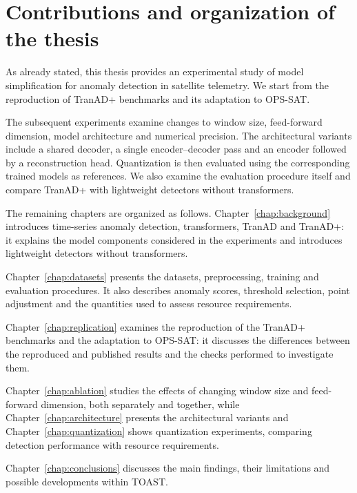 \section{Contributions and organization of the thesis}
\label{sec:introduction-contributions}

As already stated, this thesis provides an experimental study of model simplification
for anomaly detection in satellite telemetry. We start from
the reproduction of TranAD+ benchmarks and its adaptation to
\ac{OPS-SAT}.

The subsequent experiments examine changes to window size,
feed-forward dimension, model architecture and numerical precision.
The architectural variants include a shared decoder, a single
encoder--decoder pass and an encoder followed by a reconstruction head.
Quantization is then evaluated using
the corresponding trained models as references. We also examine the
evaluation procedure itself and compare TranAD+ with lightweight
detectors without transformers.

The remaining chapters are organized as follows.
Chapter~\ref{chap:background} introduces time-series anomaly detection,
transformers, TranAD and TranAD+: it explains the model components
considered in the experiments and introduces lightweight detectors
without transformers.

Chapter~\ref{chap:datasets} presents the datasets, preprocessing,
training and evaluation procedures. It also describes anomaly scores,
threshold selection, point adjustment and the quantities used to assess
resource requirements.

Chapter~\ref{chap:replication} examines the reproduction of the
TranAD+ benchmarks and the adaptation to \ac{OPS-SAT}:
it discusses the differences between the reproduced and published
results and the checks performed to investigate them.

Chapter~\ref{chap:ablation} studies the effects of changing window size
and feed-forward dimension, both separately and together, while Chapter~\ref{chap:architecture}
presents the architectural variants
and Chapter~\ref{chap:quantization} shows quantization experiments, comparing detection performance
with resource requirements.

Chapter~\ref{chap:conclusions} discusses the main findings,
their limitations and possible developments within \ac{TOAST}.
